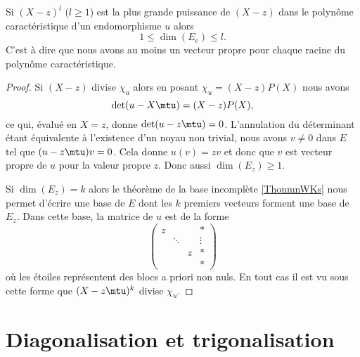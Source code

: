 \begin{proposition}\label{PropooBYZCooBmYLSc}
    Si \( (X-z)^l\) (\( l\geq 1\)) est la plus grande puissance de \( (X-z)\) dans le polynôme caractéristique d'un endomorphisme \( u\) alors 
    \begin{equation}
        1\leq \dim(E_e)\leq l.
    \end{equation}
    C'est à dire que nous avons au moins un vecteur propre pour chaque racine du polynôme caractéristique.
\end{proposition}

\begin{proof}
    Si $(X-z)$ divise \( \chi_u\) alors en posant \( \chi_u=(X-z)P(X)\) nous avons
    \begin{equation}
        \det(u-X\mtu)=(X-z)P(X),
    \end{equation}
    ce qui, évalué en \( X=z\), donne \( \det(u-z\mtu)=0\). L'annulation du déterminant étant équivalente à l'existence d'un noyau non trivial, nous avons \( v\neq 0\) dans \( E\) tel que \( (u-z\mtu)v=0\). Cela donne \( u(v)=zv\) et donc que \( v\) est vecteur propre de \( u\) pour la valeur propre \( z\). Donc aussi \( \dim(E_z)\geq 1\).

    Si \( \dim(E_z)=k\) alors le théorème de la base incomplète \ref{ThonmnWKs} nous permet d'écrire une base de \( E\) dont les \( k\) premiers vecteurs forment une base de \( E_z\). Dans cette base, la matrice de \( u\) est de la forme
    \begin{equation}
        \begin{pmatrix}
             z   &       &       &   *    \\
                &   \ddots    &       &   \vdots    \\
                &       &   z    &   *    \\ 
                &       &       &   *     
         \end{pmatrix}
    \end{equation}
    où les étoiles représentent des blocs a priori non nuls. En tout cas il est vu sous cette forme que \( (X-z\mtu)^k\) divise \( \chi_u\).
\end{proof}

\section{Diagonalisation et trigonalisation}


